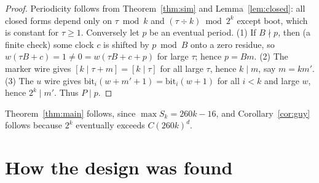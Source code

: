 \documentclass[11pt]{article}
\theoremstyle{definition}
\begin{document}
\begin{proof}
Periodicity follows from Theorem~\ref{thm:sim} and Lemma~\ref{lem:closed}: all closed forms depend
only on $\tau\bmod k$ and $(\tau\div k)\bmod 2^k$ except $\mathrm{boot}$, which is constant for
$\tau\ge1$.  Conversely let $p$ be an eventual period.
(1) If $B\nmid p$, then (a finite check) some clock $c$ is shifted by $p\bmod B$ onto a zero residue,
so $w(\tau B+c)=1\neq 0=w(\tau B+c+p)$ for large $\tau$; hence $p=Bm$.
(2) The marker wire gives $[k\mid \tau+m]=[k\mid\tau]$ for all large $\tau$, hence $k\mid m$, say
$m=km'$.
(3) The $u$ wire gives $\mathrm{bit}_i(w+m'+1)=\mathrm{bit}_i(w+1)$ for all $i<k$ and large $w$,
hence $2^k\mid m'$.  Thus $P\mid p$.
\end{proof}

Theorem~\ref{thm:main} follows, since $\max S_k=260k-16$, and Corollary~\ref{cor:guy} follows because
$2^k$ eventually exceeds $C(260k)^d$.


\section{How the design was found}\label{sec:search}
\end{document}
